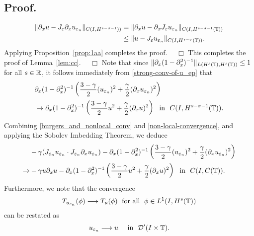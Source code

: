 \subsection{Proof.} 
\begin{equation*}
\begin{split}
\|\partial_x u - J_\varepsilon \partial_x u_{\varepsilon_n} \|_{C(I,
H^{s-\sigma-1}))}  
& = \|\partial_x u - \partial_x J_\varepsilon u_{\varepsilon_n} \|_{C(I,
H^{s-\sigma-1}(\mathbb{T}))} 
\\
& \le \|u - J_\varepsilon u_{\varepsilon_n} \|_{C(I,
H^{s-\sigma}(\mathbb{T}))}.
\end{split}
\end{equation*}
Applying Proposition~\ref{prop:1aa} completes the proof. $\quad
\Box$
%
This completes the proof of Lemma~\ref{lem:cc}. $\quad \Box$
%
Note that since $\|\partial_x (1-\partial_x^2)^{-1}\|_{L(H^s(\mathbb{T}), H^s(\mathbb{T}))}
\le 1$ for all $s \in \mathbb{R}$, it follows immediately from
\eqref{strong-conv-of-u_ep} that
\begin{equation}
\begin{split}
& \partial_x(1- \partial_x^2)^{-1} \left( \frac{3-\gamma}{2}
(u_{\varepsilon_n})^2
+ \frac{\gamma}{2} (\partial_x u_{\varepsilon_n})^2 \right )
\\
& \to
\partial_x(1- \partial_x^2)^{-1} \left( \frac{3-\gamma}{2} u^2
+ \frac{\gamma}{2} (\partial_x u)^2 \right ) \ \
\text{in} \ \ C(I, H^{s-\sigma-1}(\mathbb{T})).
\label{non-local-convergence}
\end{split}
\end{equation}
Combining \eqref{burgers_and_nonlocal_conv} and
\eqref{non-local-convergence}, and applying the Sobolev Imbedding
Theorem, we deduce 
\begin{equation}
\begin{split}
& -\gamma (J_{\varepsilon_n} u_{\varepsilon_n} \cdot J_{\varepsilon_n} \partial_x
u_{\varepsilon_n}) - \partial_x(1- \partial_x^2)^{-1} \left( \frac{3-\gamma}{2}
(u_{\varepsilon_n})^2
+ \frac{\gamma}{2} (\partial_x u_{\varepsilon_n})^2 \right )
\\
\to & -\gamma u \partial_x u -
\partial_x(1- \partial_x^2)^{-1} \left( \frac{3-\gamma}{2} u^2
+ \frac{\gamma}{2} (\partial_x u)^2 \right ) \ \
\text{in} \ \ C(I, C(\mathbb{T})).
\label{loc-non-loc-tog}
\end{split}
\end{equation}
Furthermore, we note that the convergence  
%
\begin{equation}
\label{weak-conv-2}
T_{u_{\varepsilon_n}}(\phi)  \longrightarrow  T_u(\phi) \;
\ \text{for all} \  \;  \phi \in L^1(I, H^{s}(\mathbb{T}))
\end{equation}
%
can be restated as 
%
\begin{equation}
u_{\varepsilon_n}  \longrightarrow  u
\quad
\ \text{in} \   \,\,
\mathcal{D}'(I\times \mathbb{T}).
\end{equation}
